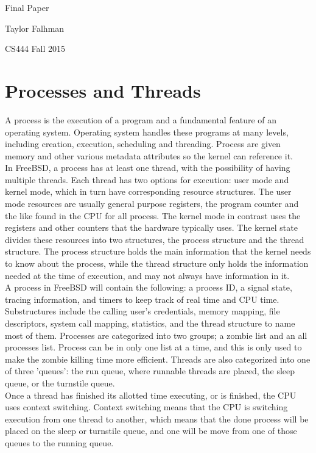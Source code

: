 \documentclass[titlepage]{article}
\begin{document}
\begin{titlepage}
\centering
{\Huge Final Paper\par}
{\LARGE Taylor Falhman\par}
{\Large CS444 Fall 2015\par}
\end{titlepage}

\section{Processes and Threads}
\begin{singlespace}
    A process is the execution of a program and a fundamental feature     of an operating system. Operating system handles these programs at many levels, including creation, execution, scheduling and threading. Process are given memory and other various metadata attributes so the kernel can reference it.\\ 
    In FreeBSD, a process has at least one thread, with the possibility of having multiple threads. Each thread has two options for execution: user mode and kernel mode, which in turn have corresponding resource structures. The user mode resources are usually general purpose registers, the program counter and the like found in the CPU for all process. The kernel mode in contrast uses the registers and other counters that the hardware typically uses. The kernel state divides these resources into two structures, the process structure and the thread structure. The process structure holds the main information that the kernel needs to know about the process, while the thread structure only holds the information needed at the time of execution, and may not always have information in it.\\
    A process in FreeBSD will contain the following: a process ID, a signal state, tracing information, and timers to keep track of real time and CPU time. Substructures include the calling user's credentials, memory mapping, file descriptors, system call mapping, statistics, and the thread structure to name most of them. Processes are categorized into two groups; a zombie list and an all processes list. Process can be in only one list at a time, and this is only used to make the zombie killing time more efficient. Threads are also categorized into one of three 'queues': the run queue, where runnable threads are placed, the sleep queue, or the turnstile queue. \\
Once a thread has finished its allotted time executing, or is finished, the CPU uses context switching. Context switching means that the CPU is switching execution from one thread to another, which means that the done process will be placed on the sleep or turnstile queue, and one will be move from one of those queues to the running queue.\\

\end{singlespace}
\end{document}
